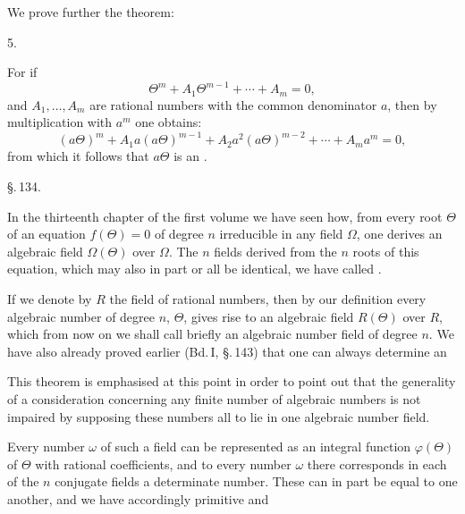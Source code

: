 
We prove further the theorem:

5. 

For if
\[
\Theta^m + A_1 \Theta^{m-1} + \cdots + A_m = 0,
\]
and $A_1, \ldots, A_m$ are rational numbers with the common denominator $a$, then
by multiplication with $a^m$ one obtains:
\[
(a\Theta)^m + A_1 a (a\Theta)^{m-1} + A_2 a^2 (a\Theta)^{m-2} + \cdots + A_m a^m = 0,
\]
from which it follows that $a\Theta$ is an .

\begin{center}
\S.\,134.

\end{center}

In the thirteenth chapter of the first volume we have seen how, from every
root $\Theta$ of an equation $f(\Theta) = 0$ of degree $n$ irreducible in any
field $\Omega$, one derives an algebraic field $\Omega(\Theta)$ over $\Omega$.
The $n$ fields derived from the $n$ roots of this equation, which may also in
part or all be identical, we have called .

If we denote by $R$ the field of rational numbers, then by our definition every
algebraic number of degree $n$, $\Theta$, gives rise to an algebraic field
$R(\Theta)$ over $R$, which from now on we shall call briefly an
algebraic number field of degree $n$. We have also already proved
earlier (Bd.\,I, \S.\,143) that one can always determine an 

This theorem is emphasised at this point in order to point out that the
generality of a consideration concerning any finite number of algebraic numbers
is not impaired by supposing these numbers all to lie in one algebraic number
field.

Every number $\omega$ of such a field can be represented as an integral
function $\varphi(\Theta)$ of $\Theta$ with rational coefficients, and to every
number $\omega$ there corresponds in each of the $n$ conjugate fields a
determinate number. These  can in part be equal to one
another, and we have accordingly primitive and
